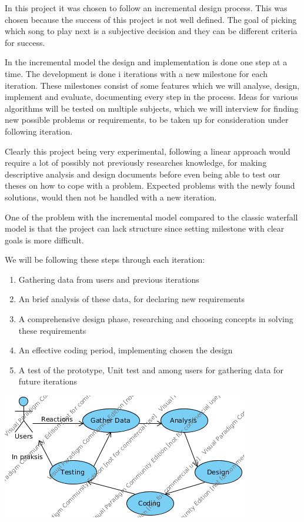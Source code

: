 In this project it was chosen to follow an incremental design process. This was chosen because the success of this project is not well defined. The goal of picking which song to play next is a subjective decision and they can be different criteria for success.

In the incremental model the design and implementation is done one step at a time. The development is done i iterations with a new milestone for each iteration. These milestones consist of some features which we will analyse, design, implement and evaluate, documenting every step in the process. Ideas for various algorithms will be tested on multiple subjects, which we will interview for finding new possible problems or requirements, to be taken up for consideration under following iteration.

Clearly this project being very experimental, following a linear approach would require a lot of possibly not previously researches knowledge, for making descriptive analysis and design documents before even being able to test our theses on how to cope with a problem. Expected problems with the newly found solutions, would then not be handled with a new iteration.

One of the problem with the incremental model compared to the classic waterfall model is that the project can lack structure since setting milestone with clear goals is more difficult.



We will be following these steps through each iteration:

\begin{enumerate}
  \item Gathering data from users and previous iterations
  \item An brief analysis of these data, for declaring new requirements
  \item A comprehensive design phase, researching and choosing concepts in solving these requirements
  \item An effective coding period, implementing chosen the design
  \item A test of the prototype, Unit test and among users for gathering data for future iterations
\end{enumerate}

\includegraphics{Images/Developmentprocess.png}
